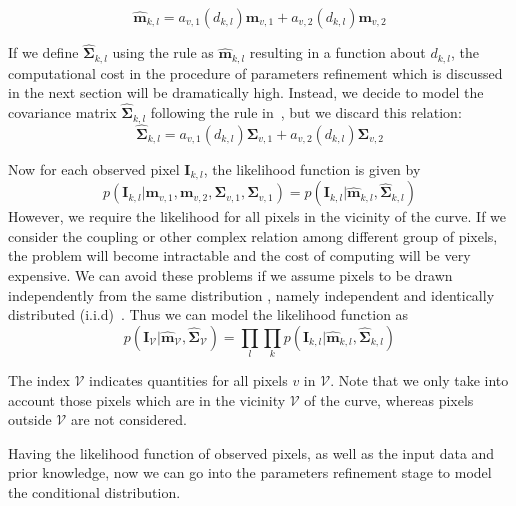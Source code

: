   \begin{equation}
    \label{eq:meankl}
    \hat{\mathbf{m}}_{k,l} = a_{v,1}(d_{k,l})\mathbf{m}_{v,1} + a_{v,2}(d_{k,l})\mathbf{m}_{v,2}
  \end{equation}

If we define  $\hat{\mathbf{\Sigma}}_{k,l}$ using the rule as
$\hat{\mathbf{m}}_{k,l}$ resulting in a function about $d_{k,l}$, the computational cost in the procedure of
parameters refinement which is discussed in the next section  will be dramatically high. Instead, we decide to
model the covariance matrix $\hat{\mathbf{\Sigma}}_{k,l}$ following the
rule in~\cite{hanek2004fitting}, but we discard this relation:
\begin{equation}
  \label{eq:sigmakl}
  \hat{\mathbf{\mathbf{\Sigma}}}_{k,l} = a_{v,1}(d_{k,l})\mathbf{\Sigma}_{v,1} + a_{v,2}(d_{k,l})\mathbf{\Sigma}_{v,2}
\end{equation}

Now for each observed pixel $\mathbf{I}_{k,l}$, the likelihood
function is given by
\begin{equation}
  \label{eq:likelihood}
p(\mathbf{I}_{k,l} | \mathbf{m}_{v,1}, \mathbf{m}_{v,2},
  \mathbf{\Sigma}_{v,1}, \mathbf{\Sigma}_{v,1}) = p(\mathbf{I}_{k,l} | \hat{\mathbf{\mathbf{m}}}_{k,l},\hat{\mathbf{\mathbf{\Sigma}}}_{k,l}) 
\end{equation}
However, we require the likelihood for all pixels in the vicinity of
the curve. If we consider the coupling or other complex relation among
different group of pixels, the problem will become intractable and the cost of computing will be very expensive. We can
avoid these problems if we assume pixels to be drawn independently from the same distribution
, namely independent and identically distributed
(i.i.d)~\cite{bishop2006pattern}. Thus we can model the likelihood function as
\begin{equation}
  \label{eq:liklihoodall}
  p(\mathbf{I}_{\mathcal{V}} |
  \hat{\mathbf{\mathbf{m}}}_{\mathcal{V}},\hat{\mathbf{\mathbf{\Sigma}}}_{\mathcal{V}})
  = \prod_l \prod_k p(\mathbf{I}_{k,l} | \hat{\mathbf{\mathbf{m}}}_{k,l},\hat{\mathbf{\mathbf{\Sigma}}}_{k,l}) 
\end{equation}

The index $\mathcal{V}$ indicates quantities for all pixels $v$ in
$\mathcal{V}$. Note that we only take into account those pixels which are
in the vicinity $\mathcal{V}$ of the curve, whereas pixels outside
$\mathcal{V}$ are not considered.

Having the likelihood function of observed pixels, as well as
the input data and prior knowledge, now we can go into the parameters
refinement stage to model the conditional distribution.

